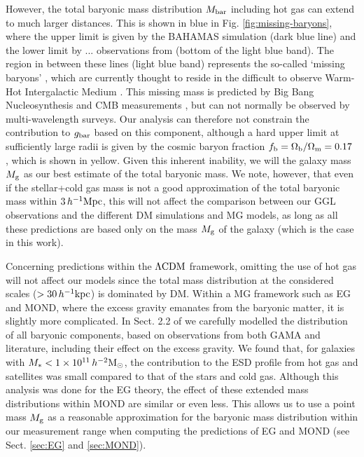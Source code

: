 \documentclass[usenatbib]{mnras}
\newcommand{\hmsun}{\,h^{-2} {\rm M_\odot}}
\newcommand{\hkpc}{\, h^{-1}{\rm{kpc}} }
\newcommand{\hMpc}{\, h^{-1}{\rm{Mpc}} }
\newcommand{\lcdm}{{\rm \Lambda CDM}}
\newcommand*{\E}[1]{\times 10^{#1}}
\newcommand{\un}[1]{_{\rm #1}}
\begin{document}
However, the total baryonic mass distribution $M\un{bar}$ including hot gas can extend to much larger distances. This is shown in blue in Fig. \ref{fig:missing-baryons}, where the upper limit is given by the BAHAMAS simulation (dark blue line) and the lower limit by ... observations from \cite{tumlinson2017} (bottom of the light blue band). The region in between these lines (light blue band) represents the so-called `missing baryons' \cite[]{fukugita1998,fukugita2004,shull2012}, which are currently thought to reside in the difficult to observe Warm-Hot Intergalactic Medium \cite[WHIM,][]{nicastro2018}. This missing mass is predicted by Big Bang Nucleosynthesis \cite[BBN,][]{kirkman2003} and CMB measurements \cite[]{spergel2003,planck2014}, but can not normally be observed by multi-wavelength surveys. Our analysis can therefore not constrain the contribution to $g\un{bar}$ based on this component, although a hard upper limit at sufficiently large radii is given by the cosmic baryon fraction $f\un{b} = \Omega\un{b}/\Omega\un{m} = 0.17$ \cite[]{hinshaw2013}, which is shown in yellow. Given this inherent inability, we will the galaxy mass $M\un{g}$ as our best estimate of the total baryonic mass. We note, however, that even if the stellar+cold gas mass is not a good approximation of the total baryonic mass within $3 \hMpc$, this will not affect the comparison between our GGL observations and the different DM simulations and MG models, as long as all these predictions are based only on the mass $M\un{g}$ of the galaxy (which is the case in this work).

Concerning predictions within the $\lcdm$ framework, omitting the use of hot gas will not affect our models since the total mass distribution at the considered scales ($>30\hkpc$) is dominated by DM. Within a MG framework such as EG and MOND, where the excess gravity emanates from the baryonic matter, it is slightly more complicated. In Sect. 2.2 of \cite{brouwer2016} we carefully modelled the distribution of all baryonic components, based on observations from both GAMA and literature, including their effect on the excess gravity. We found that, for galaxies with $M_*<1\E{11}\hmsun$, the contribution to the ESD profile from hot gas and satellites was small compared to that of the stars and cold gas. Although this analysis was done for the EG theory, the effect of these extended mass distributions within MOND are similar or even less. This allows us to use a point mass $M\un{g}$ as a reasonable approximation for the baryonic mass distribution within our measurement range when computing the predictions of EG and MOND (see Sect. \ref{sec:EG} and \ref{sec:MOND}).
\end{document}
